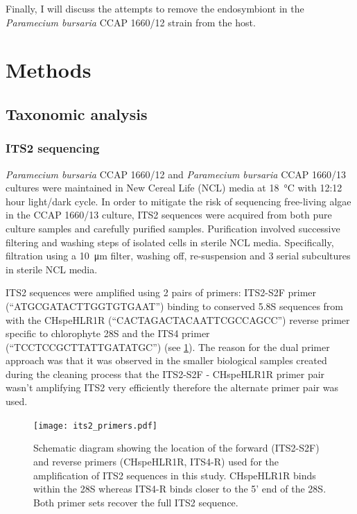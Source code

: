 Finally, I will discuss the attempts to remove the endosymbiont in the 
\textit{Paramecium bursaria} CCAP 1660/12 strain from the host.

\section{Methods}

\subsection{Taxonomic analysis}
    
\subsubsection{ITS2 sequencing}

\textit{Paramecium bursaria} CCAP 1660/12 and \textit{Paramecium bursaria} CCAP 
1660/13 cultures were maintained in New Cereal Life (NCL) media
at \SI{18}{\degreeCelsius} with 12:12 hour light/dark cycle.  In order to mitigate
the risk of sequencing free-living algae in the CCAP 1660/13 culture, ITS2
sequences were acquired from both pure culture samples and carefully purified samples.
Purification involved successive filtering and washing steps of isolated cells in sterile NCL media. 
Specifically, filtration using a \SI{10}{\micro\metre} filter, washing off, re-suspension and 3 serial subcultures
in sterile NCL media. 

ITS2 sequences were amplified using 2 pairs of primers: ITS2-S2F primer (``ATGCGATACTTGGTGTGAAT'')
binding to conserved 5.8S sequences from \citep{Chen2010} with the CHspeHLR1R 
(``CACTAGACTACAATTCGCCAGCC'')
reverse primer specific to chlorophyte 28S \citep{Hoshina2004} and the ITS4 primer 
(``TCCTCCGCTTATTGATATGC'')
\citep{white1990amplification} (see \cref{fig:its2_primers}).  The reason for the dual primer
approach was that it was observed in the smaller biological samples created during the cleaning
process that the ITS2-S2F - CHspeHLR1R primer pair wasn't amplifying ITS2 very efficiently
therefore the alternate primer pair was used. 

\begin{figure}
    \texttt{[image: its2\_primers.pdf]}
    \caption[ITS2 primer locations]{Schematic diagram showing the location of the forward (ITS2-S2F) and reverse
    primers (CHspeHLR1R, ITS4-R) used for the amplification of ITS2 sequences in this study.
    CHspeHLR1R binds within the 28S whereas ITS4-R binds closer to the 5' end of the 28S.  Both
primer sets recover the full ITS2 sequence.}
    \label{fig:its2_primers}
\end{figure}

